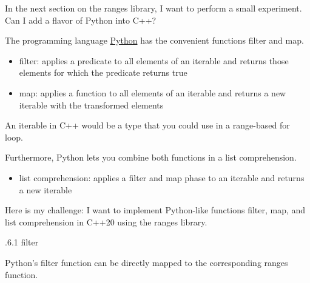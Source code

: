 In the next section on the ranges library, I want to perform a small experiment. Can I add a flavor of Python into C++?


The programming language \href{https://www.python.org/}{Python} has the convenient functions filter and map.

\begin{itemize}
\item 
filter: applies a predicate to all elements of an iterable and returns those elements for which the predicate returns true

\item 
map: applies a function to all elements of an iterable and returns a new iterable with the transformed elements
\end{itemize}

An iterable in C++ would be a type that you could use in a range-based for loop.

Furthermore, Python lets you combine both functions in a list comprehension.

\begin{itemize}
\item 
list comprehension: applies a filter and map phase to an iterable and returns a new iterable
\end{itemize}

Here is my challenge: I want to implement Python-like functions filter, map, and list comprehension in C++20 using the ranges library.

.6.1\hspace{0.2cm} filter

Python’s filter function can be directly mapped to the corresponding ranges function.

